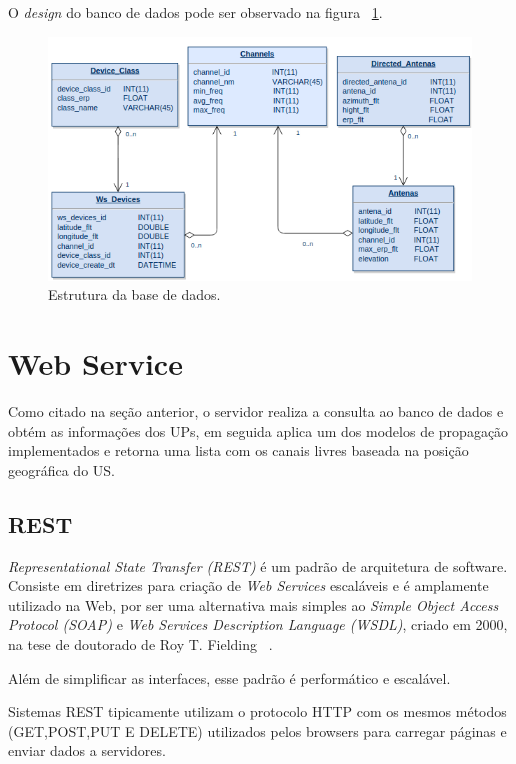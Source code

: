 O \textit{design} do banco de dados pode ser observado na figura ~\ref{fig:databasebefore}.


\begin{figure}[databasebefore]
\centering
\includegraphics[width=1.0\textwidth]{figs/databasebefore}
\caption[Estrutura da base de dados.]
{Estrutura da base de dados.}
\label{fig:databasebefore}
\end{figure}


\section{Web Service}

Como citado na seção anterior, o servidor realiza a consulta ao banco de dados e obtém as informações dos UPs, em seguida aplica um dos modelos de propagação implementados e retorna uma lista com os canais livres baseada na posição geográfica do US.

\subsection{REST}
\textit{Representational State Transfer (REST)} é um padrão de arquitetura de software. Consiste em diretrizes para criação de \textit{Web Services} escaláveis e é amplamente utilizado na Web, por ser uma alternativa mais simples ao \textit{Simple Object Access Protocol (SOAP)} e \textit{Web Services Description Language (WSDL)},
 criado em 2000, na tese de doutorado de Roy T. Fielding ~\cite{restcreator}.
 
Além de simplificar as interfaces, esse padrão é performático e escalável.

Sistemas REST tipicamente utilizam o protocolo HTTP com os mesmos métodos (GET,POST,PUT E DELETE) utilizados pelos browsers para carregar páginas e enviar dados a servidores.

